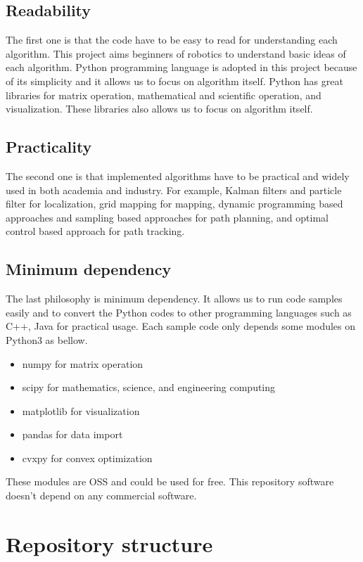 \documentclass{bmvc2k}
\begin{document}
\subsection{Readability}
The first one is that the code have to be easy to read for understanding each algorithm.
This project aims beginners of robotics to understand basic ideas of each algorithm. 
Python\cite{python} programming language is adopted in this project because of its simplicity and it allows us to focus on algorithm itself.
Python has great libraries for matrix operation, mathematical and scientific operation, and visualization.
These libraries also allows us to focus on algorithm itself.

\subsection{Practicality}
The second one is that implemented algorithms have to be practical and widely used in both academia and industry.
For example, Kalman filters and particle filter for localization, grid mapping for mapping, dynamic programming based approaches and sampling based approaches for path planning, and optimal control based approach for path tracking.

\subsection{Minimum dependency}
The last philosophy is minimum dependency.
It allows us to run code samples easily and to convert the Python codes to other programming languages such as C++, Java for practical usage.
Each sample code only depends some modules on Python3 as bellow.

\begin{itemize}
 \item numpy\cite{numpy} for matrix operation
 \item scipy\cite{scipy} for mathematics, science, and engineering computing
 \item matplotlib\cite{matplotlib} for visualization
 \item pandas\cite{pandas} for data import
 \item cvxpy\cite{cvxpy} for convex optimization
\end{itemize}

These modules are OSS and could be used for free.
This repository software doesn't depend on any commercial software.


\section{Repository structure}
\end{document}
